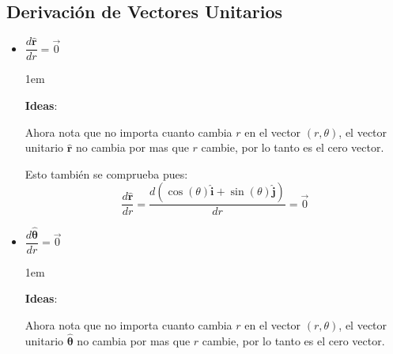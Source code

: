 \documentclass[12pt, fleqn]{report}                             %
\newenvironment{SmallIndentation}[1][0.75em]                    %
    {\begin{adjustwidth}{#1}{}\begin{footnotesize}}                 %
    {\end{footnotesize}\end{adjustwidth}}                           %
\newcommand{\Wrap}[1]{\left( #1 \right)}                        %
\newcommand{\uvec}[1]{\boldsymbol{\hat{\textbf{$#1$}}}}         %
\newcommand{\Cos}[1]{\cos\Wrap{#1}}
\newcommand{\Sin}[1]{\sin\Wrap{#1}}
\newcommand \Derivate[2] {\dfrac{d #1}{d#2}}                    %
\newcommand \pDerivate[2]{\Derivate{\Wrap{#1}}{#2}}             %
\begin{document}
            \clearpage
            \subsection{Derivación de Vectores Unitarios}

                \begin{itemize}
                    
                    \item 
                        $\Derivate{\uvec{r}}{r} = \vec{0}$
                        
                        \begin{SmallIndentation}[1em]
                            \textbf{Ideas}:

                            Ahora nota que no importa cuanto cambia $r$ en el vector $(r, \theta)$, el vector
                            unitario $\uvec{r}$ no cambia por mas que $r$ cambie, por lo tanto es el cero
                            vector.

                            Esto también se comprueba pues:
                            \begin{equation*}
                                \Derivate{\uvec{r}}{r}                                        =
                                \pDerivate{\Cos{\theta}\uvec{i} + \Sin{\theta} \uvec{j}}{r}   =
                                \vec{0}
                            \end{equation*}
                        \end{SmallIndentation}

                    \item
                        $\Derivate{\uvec{\theta}}{r} = \vec{0}$
                        
                        \begin{SmallIndentation}[1em]
                            \textbf{Ideas}:

                            Ahora nota que no importa cuanto cambia $r$ en el vector $(r, \theta)$, el vector
                            unitario $\uvec{\theta}$ no cambia por mas que $r$ cambie, por lo tanto es el
                            cero vector.


\end{SmallIndentation}
\end{itemize}
\end{document}
